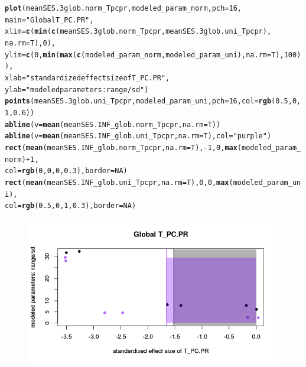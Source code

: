 \documentclass[12pt]{article}\usepackage[]{graphicx}\usepackage[]{color}
\makeatletter
\def\maxwidth{ %
  \ifdim\Gin@nat@width>\linewidth
    \linewidth
  \else
    \Gin@nat@width
  \fi
}
\newcommand{\hlnum}[1]{\textcolor[rgb]{0.686,0.059,0.569}{#1}}%
\newcommand{\hlstr}[1]{\textcolor[rgb]{0.192,0.494,0.8}{#1}}%
\newcommand{\hlopt}[1]{\textcolor[rgb]{0,0,0}{#1}}%
\newcommand{\hlstd}[1]{\textcolor[rgb]{0.345,0.345,0.345}{#1}}%
\newcommand{\hlkwc}[1]{\textcolor[rgb]{0.333,0.667,0.333}{#1}}%
\newcommand{\hlkwd}[1]{\textcolor[rgb]{0.737,0.353,0.396}{\textbf{#1}}}%
\newenvironment{kframe}{%
 \def\at@end@of@kframe{}%
 \ifinner\ifhmode%
  \def\at@end@of@kframe{\end{minipage}}%
  \begin{minipage}{\columnwidth}%
 \fi\fi%
 \def\FrameCommand##1{\hskip\@totalleftmargin \hskip-\fboxsep
 \colorbox{shadecolor}{##1}\hskip-\fboxsep
     \hskip-\linewidth \hskip-\@totalleftmargin \hskip\columnwidth}%
 \MakeFramed {\advance\hsize-\width
   \@totalleftmargin\z@ \linewidth\hsize
   \@setminipage}}%
 {\par\unskip\endMakeFramed%
 \at@end@of@kframe}
\newenvironment{knitrout}{}{} %
\makeatother
\begin{document}
\begin{knitrout}\small
{}\color{fgcolor}\begin{kframe}
\begin{alltt}
\hlkwd{plot}\hlstd{(meanSES.3glob.norm_Tpcpr, modeled_param_norm,} \hlkwc{pch} \hlstd{=} \hlnum{16}\hlstd{,}
  \hlkwc{main} \hlstd{=} \hlstr{"Global T_PC.PR"}\hlstd{,}
  \hlkwc{xlim} \hlstd{=} \hlkwd{c}\hlstd{(}\hlkwd{min}\hlstd{(}\hlkwd{c}\hlstd{(meanSES.3glob.norm_Tpcpr, meanSES.3glob.uni_Tpcpr),}
    \hlkwc{na.rm} \hlstd{= T),} \hlnum{0}\hlstd{),}
  \hlkwc{ylim} \hlstd{=} \hlkwd{c}\hlstd{(}\hlnum{0}\hlstd{,} \hlkwd{min}\hlstd{(}\hlkwd{max}\hlstd{(}\hlkwd{c}\hlstd{(modeled_param_norm, modeled_param_uni),} \hlkwc{na.rm} \hlstd{= T),} \hlnum{100}\hlstd{)),}
  \hlkwc{xlab} \hlstd{=} \hlstr{"standardized effect size of T_PC.PR"}\hlstd{,}
  \hlkwc{ylab} \hlstd{=} \hlstr{"modeled parameters: range/sd"}\hlstd{)}
\hlkwd{points}\hlstd{(meanSES.3glob.uni_Tpcpr, modeled_param_uni,} \hlkwc{pch} \hlstd{=} \hlnum{16}\hlstd{,} \hlkwc{col} \hlstd{=} \hlkwd{rgb}\hlstd{(}\hlnum{0.5}\hlstd{,} \hlnum{0}\hlstd{,} \hlnum{1}\hlstd{,} \hlnum{0.6}\hlstd{))}
\hlkwd{abline}\hlstd{(}\hlkwc{v} \hlstd{=} \hlkwd{mean}\hlstd{(meanSES.INF_glob.norm_Tpcpr,} \hlkwc{na.rm} \hlstd{= T))}
\hlkwd{abline}\hlstd{(}\hlkwc{v} \hlstd{=} \hlkwd{mean}\hlstd{(meanSES.INF_glob.uni_Tpcpr,} \hlkwc{na.rm} \hlstd{= T),} \hlkwc{col} \hlstd{=} \hlstr{"purple"}\hlstd{)}
\hlkwd{rect}\hlstd{(}\hlkwd{mean}\hlstd{(meanSES.INF_glob.norm_Tpcpr,} \hlkwc{na.rm} \hlstd{= T),} \hlopt{-}\hlnum{1}\hlstd{,} \hlnum{0}\hlstd{,} \hlkwd{max}\hlstd{(modeled_param_norm)} \hlopt{+} \hlnum{1}\hlstd{,}
  \hlkwc{col} \hlstd{=} \hlkwd{rgb}\hlstd{(}\hlnum{0}\hlstd{,} \hlnum{0}\hlstd{,} \hlnum{0}\hlstd{,} \hlnum{0.3}\hlstd{),} \hlkwc{border} \hlstd{=} \hlnum{NA}\hlstd{)}
\hlkwd{rect}\hlstd{(}\hlkwd{mean}\hlstd{(meanSES.INF_glob.uni_Tpcpr,} \hlkwc{na.rm} \hlstd{= T),} \hlnum{0}\hlstd{,} \hlnum{0}\hlstd{,} \hlkwd{max}\hlstd{(modeled_param_uni),}
  \hlkwc{col} \hlstd{=} \hlkwd{rgb}\hlstd{(}\hlnum{0.5}\hlstd{,} \hlnum{0}\hlstd{,} \hlnum{1}\hlstd{,} \hlnum{0.3}\hlstd{),} \hlkwc{border} \hlstd{=} \hlnum{NA}\hlstd{)}
\end{alltt}
\end{kframe}\begin{figure}

{\centering \includegraphics[width=\maxwidth]{figure/External_filter_Results_plots_modeled_param2-1} 

}
\end{figure}
\end{knitrout}
\end{document}
